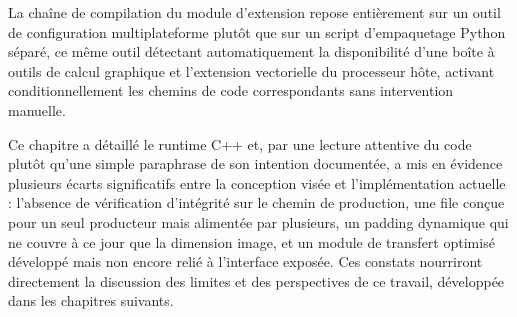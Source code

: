 \documentclass[12pt,a4paper]{report}
\begin{document}
La chaîne de compilation du module d'extension repose entièrement sur un outil de configuration multiplateforme plutôt que sur un script d'empaquetage Python séparé, ce même outil détectant automatiquement la disponibilité d'une boîte à outils de calcul graphique et l'extension vectorielle du processeur hôte, activant conditionnellement les chemins de code correspondants sans intervention manuelle.

\bigskip
\noindent Ce chapitre a détaillé le runtime C++ et, par une lecture attentive du code plutôt qu'une simple paraphrase de son intention documentée, a mis en évidence plusieurs écarts significatifs entre la conception visée et l'implémentation actuelle : l'absence de vérification d'intégrité sur le chemin de production, une file conçue pour un seul producteur mais alimentée par plusieurs, un padding dynamique qui ne couvre à ce jour que la dimension image, et un module de transfert optimisé développé mais non encore relié à l'interface exposée. Ces constats nourriront directement la discussion des limites et des perspectives de ce travail, développée dans les chapitres suivants.
\end{document}
